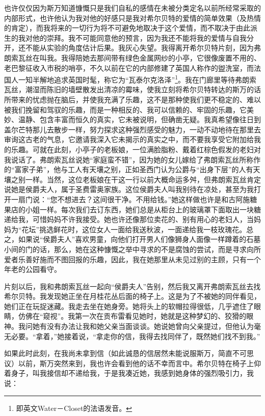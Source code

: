 \par 也许仅仅因为斯万知道慷慨只是我们自私的感情在未被分类定名以前所经常采取的内部形式，也许他认为我对他的好感只是我对希尔贝特的爱情的简单效果（及热情的肯定），而我将来的一切行为将不可避免地取决于这个爱情，而不取决于由此派生的我对他的崇拜。我不可能同意他的预言，因为我还不能将我的爱情与自我分开，还不能从实验的角度估计后果。我灰心失望。我得离开希尔贝特片刻，因为弗朗索瓦丝在叫我。我得陪她去那间带有绿色金属网纱的小亭，它很像废置不用的、老巴黎征收入市税的哨亭，不久以前在它的内部修建了英国人称作的盥洗室，而法国人一知半解地追求英国时髦，称它为“瓦泰尔克洛泽”\footnote{即英文Water－Closet的法语发音。}。我在门廊里等待弗朗索瓦丝，潮湿而陈旧的墙壁散发出清凉的霉味，使我立刻将希尔贝特转达的斯万的话所带来的忧虑抛在脑后，并使我充满了乐趣，这不是那种使我们更不稳定的、难以被我们挽留和驾驭的乐趣，而是一种相反的、我可以信赖的、牢固的乐趣，它美妙、温静、包含丰富而恒久的真实，它未被说明，但确凿无疑。我真希望像往日到盖尔芒特那儿去散步一样，努力探求这种强烈感受的魅力，一动不动地待在那里去审询这古老的气息，它邀请我深入它未揭示的真实之中，而不要我享受它附加给我的乐趣。可就在此刻，小亭子的老板娘，一位满脸脂粉、戴着红棕色假发的老妇对我说话了。弗朗索瓦丝说她“家庭蛮不错”，因为她的女儿嫁给了弗朗索瓦丝所称作的“富家子弟”，他与工人有天壤之别，正如圣西门认为公爵与“出身下层”的人有天壤之别一样。当然，这位老板娘在干这一行以前大概命运多舛，但弗朗索瓦丝肯定说她是侯爵夫人，属于圣费雷奥家族。这位侯爵夫人叫我别待在凉处，甚至为我打开一扇门说：“您不想进去？这间很干净。不用给钱。”她这样做也许是和古阿施糖果店的小姐一样。每次我们去订东西，她们总是从柜台上的玻璃罩下面取出一块糖递给我，可惜妈妈不许我接受。她也许还像那位卖花的、别有用心的老妇人，当妈妈为“花坛”挑选鲜花时，这位女人一面给我送秋波，一面递给我一枝玫瑰花。总之，如果说“侯爵夫人”喜欢男童，向他们打开男人们像狮身人面像一样蹲着的石墓小间的门的话，那么，她在这种慷慨之举中寻求的不是腐蚀的尝试，而是寻求向所爱者乐善好施而不图回报的乐趣，因此，我在她那里从未见过别的主顾，只有一个年老的公园看守。
\par 片刻以后，我和弗朗索瓦丝一起向“侯爵夫人”告别，然后我又离开弗朗索瓦丝去找希尔贝特。我发现她正坐在月桂花丛后面的椅子上。这是为了不被她的同伴看见，她们正在玩捉迷藏。我走去坐在她身旁。她将头上的软帽拉得很低，几乎遮住了眼睛，仿佛在“窥视”。我第一次在贡布雷看见她时，她就是这种梦幻的、狡猾的眼神。我问她有没有办法让我和她父亲当面谈谈。她说她曾向父亲提过，但他认为毫无必要。“拿着，”她接着说，“拿走你的信，我得去找同伴了，既然她们找不到我。”
\par 如果此时此刻，在我尚未拿到信（如此诚恳的信居然未能说服斯万，简直不可思议）以前，斯万突然来到，我也许会看到他的话不幸而言中。希尔贝特在椅子上仰着身子，叫我接信却不递给我，于是我凑近她，我感到她身体的强烈吸引力，我说：
